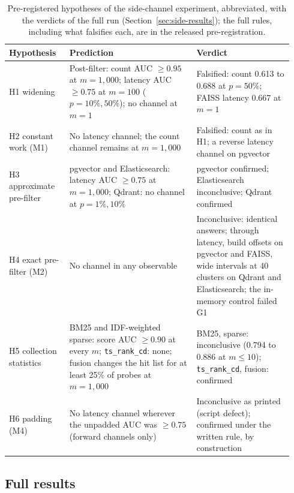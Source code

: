 \begin{table}[tbp]
\centering
\small
\begin{tabular}{@{}p{0.20\linewidth}p{0.42\linewidth}p{0.32\linewidth}@{}}
\toprule
Hypothesis & Prediction & Verdict \\
\midrule
H1 widening & Post-filter: count AUC $\ge 0.95$ at $m = 1{,}000$; latency AUC $\ge 0.75$ at $m = 100$
  ($p = 10\%, 50\%$); no channel at $m = 1$ & Falsified: count 0.613 to 0.688 at $p = 50\%$;
  FAISS latency 0.667 at $m = 1$ \\
H2 constant work (M1) & No latency channel; the count channel remains at $m = 1{,}000$ & Falsified:
  count as in H1; a reverse latency channel on pgvector \\
H3 approximate pre-filter & pgvector and Elasticsearch: latency AUC $\ge 0.75$ at $m = 1{,}000$;
  Qdrant: no channel at $p = 1\%, 10\%$ & pgvector confirmed; Elasticsearch inconclusive; Qdrant
  confirmed \\
H4 exact pre-filter (M2) & No channel in any observable & Inconclusive: identical answers; through latency, build offsets on pgvector and FAISS, wide intervals at 40 clusters on Qdrant and Elasticsearch; the in-memory control failed G1 \\
H5 collection statistics & BM25 and IDF-weighted sparse: score AUC $\ge 0.90$ at every $m$;
  \texttt{ts\_rank\_cd}: none; fusion changes the hit list for at least 25\% of probes at
  $m = 1{,}000$ & BM25, sparse: inconclusive (0.794 to 0.886 at $m \le 10$);
  \texttt{ts\_rank\_cd}, fusion: confirmed \\
H6 padding (M4) & No latency channel wherever the unpadded AUC was $\ge 0.75$ (forward channels
  only) & Inconclusive as printed (script defect); confirmed under the written rule, by construction \\
\bottomrule
\end{tabular}
\caption{Pre-registered hypotheses of the side-channel experiment, abbreviated, with the verdicts of
the full run (Section~\ref{sec:side-results}); the full rules, including what falsifies each, are in
the released pre-registration.}
\label{tab:side-hyp}
\end{table}

\subsection{Full results}\label{app:side-results}

